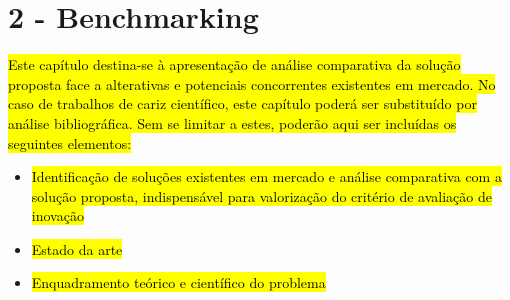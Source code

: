 \chapter*{2 - Benchmarking}

\hl{Este capítulo destina-se à apresentação de análise comparativa da solução proposta face a alterativas e potenciais concorrentes existentes em mercado. No caso de trabalhos de cariz científico, este capítulo poderá ser substituído por análise bibliográfica.
Sem se limitar a estes, poderão aqui ser incluídas os seguintes elementos:}
\begin{itemize}
    \item \hl{Identificação de soluções existentes em mercado e análise comparativa com a solução proposta, indispensável para valorização do critério de avaliação de inovação}
    \item \hl{Estado da arte}
    \item \hl{Enquadramento teórico e científico do problema}
\end{itemize}